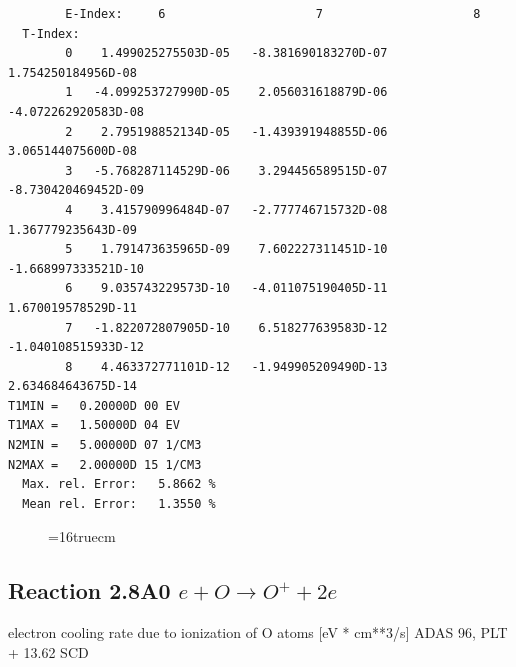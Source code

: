\documentclass[12pt,dvipdfmx]{article}
\begin{document}
\begin{small}
\begin{verbatim}
        E-Index:     6                     7                     8
  T-Index:
        0    1.499025275503D-05   -8.381690183270D-07    1.754250184956D-08
        1   -4.099253727990D-05    2.056031618879D-06   -4.072262920583D-08
        2    2.795198852134D-05   -1.439391948855D-06    3.065144075600D-08
        3   -5.768287114529D-06    3.294456589515D-07   -8.730420469452D-09
        4    3.415790996484D-07   -2.777746715732D-08    1.367779235643D-09
        5    1.791473635965D-09    7.602227311451D-10   -1.668997333521D-10
        6    9.035743229573D-10   -4.011075190405D-11    1.670019578529D-11
        7   -1.822072807905D-10    6.518277639583D-12   -1.040108515933D-12
        8    4.463372771101D-12   -1.949905209490D-13    2.634684643675D-14
T1MIN =   0.20000D 00 EV
T1MAX =   1.50000D 04 EV
N2MIN =   5.00000D 07 1/CM3
N2MAX =   2.00000D 15 1/CM3
  Max. rel. Error:   5.8662 %
  Mean rel. Error:   1.3550 %
\end{verbatim}\end{small}

\begin{figure} \label{2.7ilr}
\epsfxsize=16truecm 
\end{figure}
\newpage

\subsection{
  Reaction 2.8A0  $e + O  \rightarrow O^+   + 2e $
}
electron cooling rate due to ionization of O atoms [eV * cm**3/s]
ADAS 96, PLT + 13.62 SCD
\end{document}
